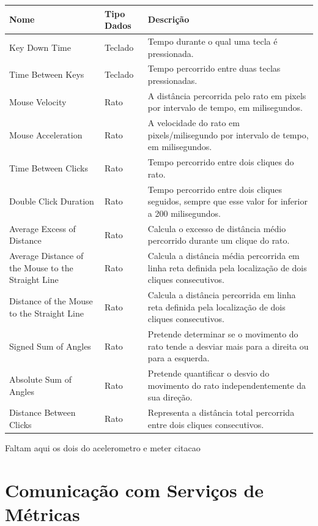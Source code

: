 \begin{center}
    \begin{tabular}{ | p{4cm} | l | p{7cm} |}
    \hline
    Nome & Tipo Dados & Descrição \\ \hline
    Key Down Time & Teclado & Tempo durante o qual uma tecla é pressionada. \\ \hline    		    Time Between Keys & Teclado & Tempo percorrido entre duas teclas pressionadas. \\ \hline
    Mouse Velocity & Rato & A distância percorrida pelo rato em pixels por intervalo de tempo, em milisegundos. \\ \hline
    Mouse Acceleration & Rato & A velocidade do rato em pixels/milisegundo por intervalo de tempo, em milisegundos. \\ \hline
    Time Between Clicks & Rato & Tempo percorrido entre dois cliques do rato. \\ \hline
    Double Click Duration & Rato & Tempo percorrido entre dois cliques seguidos, sempre que esse valor for inferior a 200 milisegundos. \\ \hline
    Average Excess of Distance & Rato & Calcula o excesso de distância médio percorrido durante um clique do rato. \\ \hline
    Average Distance of the Mouse to the Straight Line & Rato & Calcula a distância média percorrida em linha reta definida pela localização de dois cliques consecutivos. \\ \hline
    Distance of the Mouse to the Straight Line & Rato & Calcula a distância percorrida em linha reta definida pela localização de dois cliques consecutivos. \\ \hline
    Signed Sum of Angles & Rato & Pretende determinar se o movimento do rato tende a desviar mais para a direita ou para a esquerda. \\ \hline
    Absolute Sum of Angles & Rato & Pretende quantificar o desvio do movimento do rato independentemente da sua direção. \\ \hline
    Distance Between Clicks & Rato & Representa a distância total percorrida entre dois cliques consecutivos. \\ \hline
    \end{tabular}
\end{center}

Faltam aqui os dois do acelerometro e meter citacao 

\section{Comunicação com Serviços de Métricas}

